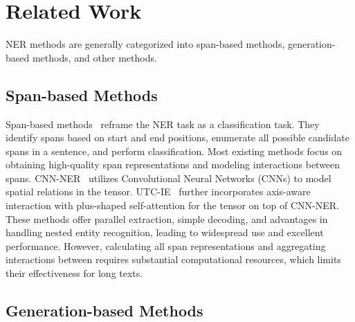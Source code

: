 \section{Related Work}

NER methods are generally categorized into span-based methods, generation-based methods, and other methods.

\subsection{Span-based Methods}

Span-based methods~\cite{li2022unified,yuan-etal-2022-fusing,su2022global,zhu2022boundary} reframe the NER task as a \tokenspan
classification task. 
They identify spans based on start and end positions, enumerate all possible candidate spans in a sentence, and perform classification. 
Most existing methods focus on obtaining high-quality span representations and modeling interactions between spans.
CNN-NER~\cite{yan-etal-2023-embarrassingly} utilizes Convolutional Neural Networks (CNNs) to model spatial relations in the \tokenspan tensor. 
UTC-IE~\cite{yan-etal-2023-utc} further incorporates axis-aware interaction with plus-shaped self-attention for the \tokenspan tensor on top of CNN-NER.
These methods offer parallel extraction, simple decoding, and advantages in handling nested entity recognition, leading to widespread use and excellent performance. 
However, calculating all span representations and aggregating interactions between \tokenspans requires substantial computational resources, which limits their effectiveness for long texts. 

\subsection{Generation-based Methods}

